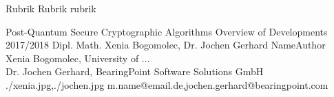 \documentclass[a4paper,11pt,draft]{article}
\begin{document}
\setcounter{footnote}{0}
\setcounter{figure}{0}


\Abschnitt
{Rubrik}
{Rubrik}
{rubrik}

\vspace{3mm}


\Aufsatz
{Post-Quantum Secure Cryptographic Algorithms}
{Overview of Developments 2017/2018}
{Dipl. Math. Xenia Bogomolec, Dr. Jochen Gerhard}
{NameAuthor}
{Xenia Bogomolec, University of ...\\ Dr. Jochen Gerhard, BearingPoint Software Solutions GmbH}
{./xenia.jpg,./jochen.jpg}
{m.name@email.de,jochen.gerhard@bearingpoint.com}
\end{document}
